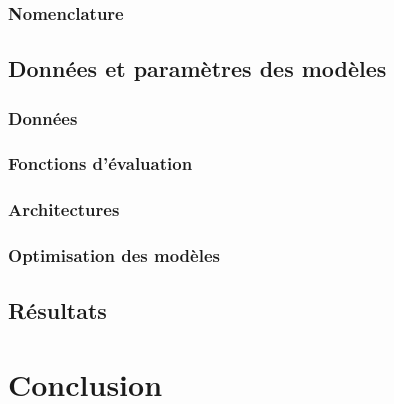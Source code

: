 \documentclass{report}
\begin{document}
		\subsection{Nomenclature}
			
			
	\section{Données et paramètres des modèles}
		\subsection{Données}
			
		\subsection{Fonctions d'évaluation}
				
		\subsection{Architectures}
			
		\subsection{Optimisation des modèles}
			
		
	\section{Résultats}
		




\chapter{Conclusion}
	
	

\addappheadtotoc
\appendixpage

\appendix
\end{document}
